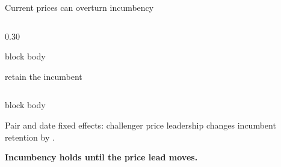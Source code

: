 \begin{frame}[label=contest]{Current prices can overturn incumbency}
\begin{columns}[T,totalwidth=0.95\textwidth]
\begin{column}{0.30\textwidth}
\begin{beamercolorbox}[rounded=true,sep=0.24cm,wd=\textwidth]{block body}
{\small retain the incumbent\par}
\end{beamercolorbox}
\end{column}
\end{columns}
\vspace{0.14cm}
\begin{beamercolorbox}[rounded=true,sep=0.16cm,wd=0.95\textwidth]{block body}
\centering
{\small Pair and date fixed effects: challenger price leadership changes incumbent retention by\quad
{\fontsize{19}{21}\selectfont\bfseries\color{accent}\ContestChallengerEffect}.\par}
\end{beamercolorbox}
\vspace{0.08cm}
{\large\bfseries\color{ucldark}\centering Incumbency holds until the price lead moves.\par}
\end{frame}

